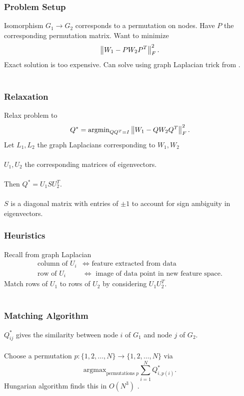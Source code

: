 \documentclass{beamer}
\begin{document}

\begin{frame}
  \frametitle{Problem Setup}
  Isomorphism $G_1\to G_2$ corresponds to a permutation on nodes. Have $P$ the corresponding permutation matrix. Want to minimize
  \[\left\lVert W_1 - PW_2P^T\right\rVert^2_F.\]
  Exact solution is too expensive. Can solve using graph Laplacian trick from \cite{Umeyama1988,Knossow2009}.\\~\\
\end{frame}


\begin{frame}
  \frametitle{Relaxation}
  Relax problem to
  \[Q^* = \text{argmin}_{QQ^T=I}\left\lVert W_1 - QW_2Q^T\right\rVert^2_F.\]
  Let $L_1,L_2$ the graph Laplacians corresponding to $W_1,W_2$ \\~\\
  $U_1,U_2$ the corresponding matrices of eigenvectors. \\~\\
  Then $Q^* = U_1SU_2^T$.\\~\\
  $S$ is a diagonal matrix with entries of $\pm 1$ to account for sign ambiguity in eigenvectors.
\end{frame}


\begin{frame}
  \frametitle{Heuristics}
  Recall from graph Laplacian
  \begin{align*}
    \text{column of }U_i &\iff \text{ feature extracted from data} \\
    \text{row of }U_i &\iff \text{ image of data point in new feature space}.
  \end{align*}
  Match rows of $U_1$ to rows of $U_2$ by considering $U_1U_2^T$. \\~\\
\end{frame}


\begin{frame}
  \frametitle{Matching Algorithm}
  $Q^*_{ij}$ gives the similarity between node $i$ of $G_1$ and node $j$ of $G_2$. \\~\\
  Choose a permutation $p: \{1,2,\ldots,N\} \to \{1,2,\ldots,N\}$ via
  \[\text{argmax}_{\text{permutations }p}\sum_{i=1}^N Q^*_{i,p(i)}.\]
  Hungarian algorithm finds this in $O(N^3)$ \cite{Munkres1957}.
\end{frame}
\end{document}
